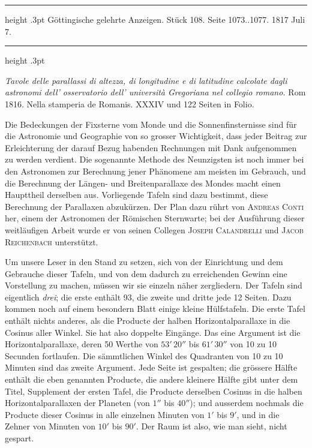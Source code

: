 \par\bigskip
\hypertarget{native-604-lower}{}
\begin{center}
\parbox{.84\linewidth}{%
\centering\small
\hrule height .3pt\relax\vspace{2.5pt}
Göttingische gelehrte Anzeigen. Stück 108. Seite 1073..1077. 1817 Juli 7.\par
\vspace{2.5pt}\hrule height .3pt\relax
}
\end{center}

\emph{Tavole delle parallassi di altezza, di longitudine e di latitudine calcolate dagli astronomi dell' osservatorio dell' università Gregoriana nel collegio romano.} Rom 1816. Nella stamperia de Romanis. XXXIV und 122 Seiten in Folio.

Die Bedeckungen der Fixsterne vom Monde und die Sonnenfinsternisse sind für die Astronomie und Geographie von so grosser Wichtigkeit, dass jeder Beitrag zur Erleichterung der darauf Bezug habenden Rechnungen mit Dank aufgenommen zu werden verdient. Die sogenannte Methode des Neunzigsten ist noch immer bei den Astronomen zur Berechnung jener Phänomene am meisten im Gebrauch, und die Berechnung der Längen- und Breitenparallaxe des Mondes macht einen Haupttheil derselben aus. Vorliegende Tafeln sind dazu bestimmt, diese Berechnung der Parallaxen abzukürzen. Der Plan dazu rührt von \textsc{Andreas Conti} her, einem der Astronomen der Römischen Sternwarte; bei der Ausführung dieser weitläufigen Arbeit wurde er von seinen Collegen \textsc{Joseph Calandrelli} und \textsc{Jacob Reichenbach} unterstützt.

Um unsere Leser in den Stand zu setzen, sich von der Einrichtung und dem Gebrauche dieser Tafeln, und von dem dadurch zu erreichenden Gewinn eine Vorstellung zu machen, müssen wir sie einzeln näher zergliedern. Der Tafeln sind eigentlich \emph{drei}; die erste enthält 93, die zweite und dritte jede 12 Seiten. Dazu kommen noch auf einem besondern Blatt einige kleine Hülfstafeln. Die erste Tafel enthält nichts anderes, als die Producte der halben Horizontalparallaxe in die Cosinus aller Winkel. Sie hat also doppelte Eingänge. Das eine Argument ist die Horizontalparallaxe, deren 50 Werthe von $53'\,20''$ bis $61'\,30''$ von 10 zu 10 Secunden fortlaufen. Die sämmtlichen Winkel des Quadranten von 10 zu 10 Minuten sind das zweite Argument. Jede Seite ist gespalten; die grössere Hälfte enthält die eben genannten Producte, die andere kleinere Hälfte gibt unter dem Titel, Supplement der ersten Tafel, die Producte derselben Cosinus in die halben Horizontalparallaxen der Planeten (von $1''$ bis $40''$); und ausserdem nochmals die Producte dieser Cosinus in alle einzelnen Minuten von $1'$ bis $9'$, und in die Zehner von Minuten von $10'$ bis $90'$. Der Raum ist also, wie man sieht, nicht gespart.

